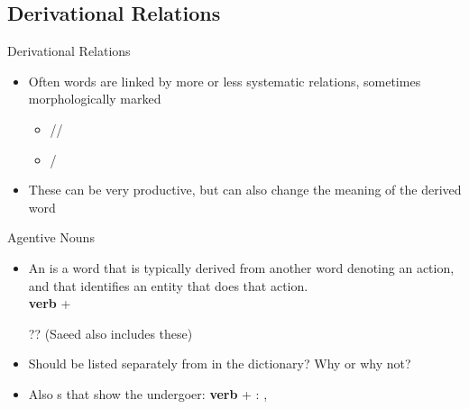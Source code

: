 \subsection*{Derivational Relations}
\begin{frame}{Derivational Relations}

\begin{itemize}
\item Often words are linked by more or less systematic relations, sometimes morphologically marked
  \begin{itemize}
  \item {}//
  \item {}/
  \end{itemize}
\item These can be very productive, but can also change the meaning of the derived word
\end{itemize}
\end{frame}

\begin{frame}{Agentive Nouns}
\MyLogo{}
\begin{itemize}
\item An  is a word that is typically derived from
  another word denoting an action, and that identifies an entity that
  does that action.  \\ \textbf{verb} + 
  \begin{exe}
    \ex {}
    \ex ??  (Saeed also includes these)
  \end{exe}
\item Should  be listed separately from  in
the dictionary? Why or why not?
\item Also s that show the undergoer:
  \textbf{verb} + : , 
\end{itemize}
\end{frame}


